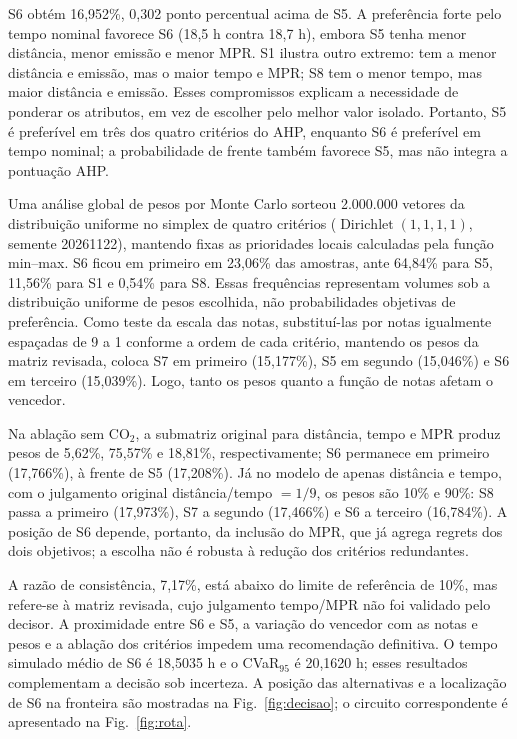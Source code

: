 \documentclass[conference]{IEEEtran}
\begin{document}
S6 obtém 16,952\%, 0,302 ponto percentual acima de S5. A preferência
forte pelo tempo nominal favorece S6 (18,5 h contra 18,7 h), embora S5 tenha
menor distância, menor emissão e menor MPR. S1 ilustra outro
extremo: tem a menor distância e emissão, mas o maior tempo e MPR; S8 tem
o menor tempo, mas maior distância e emissão. Esses compromissos explicam a
necessidade de ponderar os atributos, em vez de escolher pelo melhor valor
isolado. Portanto, S5 é preferível em três dos quatro critérios do AHP,
enquanto S6 é preferível em tempo nominal; a probabilidade de frente também
favorece S5, mas não integra a pontuação AHP.

Uma análise global de pesos por Monte Carlo sorteou 2.000.000 vetores da
distribuição uniforme no simplex de quatro critérios
($\operatorname{Dirichlet}(1,1,1,1)$, semente 20261122), mantendo fixas as
prioridades locais calculadas pela função min--max. S6 ficou em primeiro em
23,06\% das amostras, ante 64,84\% para S5, 11,56\% para S1 e 0,54\% para
S8. Essas frequências representam volumes sob a distribuição uniforme de
pesos escolhida, não probabilidades objetivas de preferência. Como teste da
escala das notas, substituí-las por notas igualmente espaçadas de 9 a 1
conforme a ordem de cada critério, mantendo os pesos da matriz revisada,
coloca S7 em primeiro (15,177\%), S5 em segundo (15,046\%) e S6 em terceiro
(15,039\%). Logo, tanto os pesos quanto a função de notas afetam o vencedor.

Na ablação sem CO$_2$, a submatriz original para distância, tempo e MPR
produz pesos de 5,62\%, 75,57\% e 18,81\%, respectivamente; S6 permanece em
primeiro (17,766\%), à frente de S5 (17,208\%). Já no modelo de apenas
distância e tempo, com o julgamento original distância/tempo $=1/9$, os pesos
são 10\% e 90\%: S8 passa a primeiro (17,973\%), S7 a segundo (17,466\%) e
S6 a terceiro (16,784\%). A posição de S6 depende, portanto, da inclusão do
MPR, que já agrega regrets dos dois objetivos; a escolha não é robusta à
redução dos critérios redundantes.

A razão de consistência, 7,17\%, está abaixo do limite de referência de 10\%,
mas refere-se à matriz revisada, cujo julgamento tempo/MPR não foi validado
pelo decisor. A proximidade entre S6 e S5, a variação do vencedor com as notas
e pesos e a ablação dos critérios impedem uma recomendação definitiva. O
tempo simulado médio de S6 é 18,5035 h e o CVaR$_{95}$ é 20,1620 h; esses
resultados complementam a decisão sob incerteza. A posição das alternativas
e a localização de S6 na fronteira são mostradas na Fig.~\ref{fig:decisao};
o circuito correspondente é apresentado na Fig.~\ref{fig:rota}.
\end{document}
